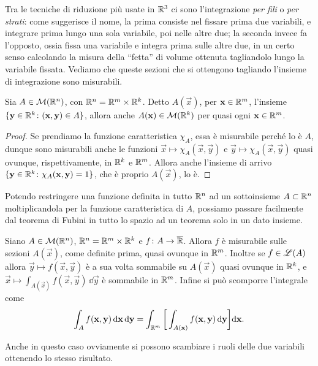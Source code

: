 Tra le tecniche di riduzione più usate in $\mathbb{R}^3$ ci sono l'integrazione \emph{per fili} o \emph{per strati}: come suggerisce il nome, la prima consiste nel fissare prima due variabili, e integrare prima lungo una sola variabile, poi nelle altre due; la seconda invece fa l'opposto, ossia fissa una variabile e integra prima sulle altre due, in un certo senso calcolando la misura della ``fetta'' di volume ottenuta tagliandolo lungo la variabile fissata.
Vediamo che queste sezioni che si ottengono tagliando l'insieme di integrazione sono misurabili.
\begin{lemma} \label{l:sezioni-misurabili}
	Sia $A\in\mathcal M(\mathbb{R}^n)$, con $\mathbb{R}^n=\mathbb{R}^m\times\mathbb{R}^k$.
	Detto $A(\vec x)$, per $\mathbf{x}\in\mathbb{R}^m$, l'insieme $\{\mathbf{y}\in\mathbb{R}^k\colon(\mathbf{x},\mathbf{y})\in A\}$, allora anche $A(\mathbf{x})\in\mathcal M(\mathbb{R}^k)$ per quasi ogni $\mathbf{x}\in\mathbb{R}^m$.
\end{lemma}
\begin{proof}
	Se prendiamo la funzione caratteristica $\chi_A$, essa è misurabile perch\'e lo è $A$, dunque sono misurabili anche le funzioni $\vec x\mapsto\chi_A(\vec x,\vec y)$ e $\vec y\mapsto\chi_A(\vec x,\vec y)$ quasi ovunque, rispettivamente, in $\mathbb{R}^k$ e $\mathbb{R}^m$.
	Allora anche l'insieme di arrivo $\{\mathbf{y}\in\mathbb{R}^k\colon\chi_A(\mathbf{x},\mathbf{y})=1\}$, che è proprio $A(\vec x)$, lo è.
\end{proof}
Potendo restringere una funzione definita in tutto $\mathbb{R}^n$ ad un sottoinsieme $A\subset\mathbb{R}^n$ moltiplicandola per la funzione caratteristica di $A$, possiamo passare facilmente dal teorema di Fubini in tutto lo spazio ad un teorema solo in un dato insieme.
\begin{teorema} \label{t:fubini2}
	Siano $A\in\mathcal M(\mathbb{R}^n)$, $\mathbb{R}^n=\mathbb{R}^m\times\mathbb{R}^k$ e $f\colon A\to\overline{\mathbb{R}}$.
	Allora $f$ è misurabile sulle sezioni $A(\vec x)$, come definite prima, quasi ovunque in $\mathbb{R}^m$.
	Inoltre se $f\in\mathscr L(A)$ allora $\vec y\mapsto f(\vec x,\vec y)$ è a sua volta sommabile su $A(\vec x)$ quasi ovunque in $\mathbb{R}^k$, e $\vec x\mapsto\int_{A(\vec x)}f(\vec x,\vec y)\,\dd\vec y$ è sommabile in $\mathbb{R}^m$.
	Infine si può scomporre l'integrale come
	\begin{equation}
		\int_Af(\mathbf{x},\mathbf{y})\,\textup{d}\mathbf{x}\,\textup{d}\mathbf{y}=\int_{\mathbb{R}^m}\bigg[\int_{A(\mathbf{x})}f(\mathbf{x},\mathbf{y})\,\textup{d}\mathbf{y}\bigg]\textup{d}\mathbf{x}.
	\end{equation}
\end{teorema}
Anche in questo caso ovviamente si possono scambiare i ruoli delle due variabili ottenendo lo stesso risultato.


